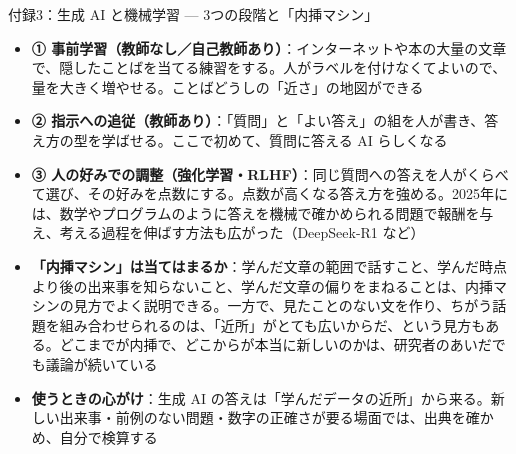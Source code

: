 \documentclass[aspectratio=169]{beamer}
\begin{document}
\begin{frame}{付録3：生成 AI と機械学習 — 3つの段階と「内挿マシン」}
\footnotesize
\begin{itemize}
  \item \textbf{① 事前学習（教師なし／自己教師あり）}：インターネットや本の大量の文章で、隠したことばを当てる練習をする。人がラベルを付けなくてよいので、量を大きく増やせる。ことばどうしの「近さ」の地図ができる
  \item \textbf{② 指示への追従（教師あり）}：「質問」と「よい答え」の組を人が書き、答え方の型を学ばせる。ここで初めて、質問に答える AI らしくなる
  \item \textbf{③ 人の好みでの調整（強化学習・RLHF）}：同じ質問への答えを人がくらべて選び、その好みを点数にする。点数が高くなる答え方を強める。2025年には、数学やプログラムのように答えを機械で確かめられる問題で報酬を与え、考える過程を伸ばす方法も広がった（DeepSeek-R1 など）
  \item \textbf{「内挿マシン」は当てはまるか}：学んだ文章の範囲で話すこと、学んだ時点より後の出来事を知らないこと、学んだ文章の偏りをまねることは、内挿マシンの見方でよく説明できる。一方で、見たことのない文を作り、ちがう話題を組み合わせられるのは、「近所」がとても広いからだ、という見方もある。どこまでが内挿で、どこからが本当に新しいのかは、研究者のあいだでも議論が続いている
  \item \textbf{使うときの心がけ}：生成 AI の答えは「学んだデータの近所」から来る。新しい出来事・前例のない問題・数字の正確さが要る場面では、出典を確かめ、自分で検算する
\end{itemize}
\end{frame}
\end{document}
